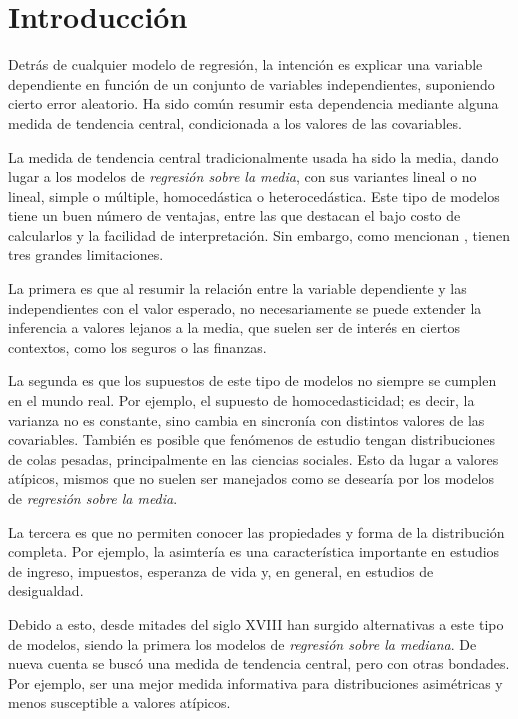 \chapter{Introducci\'on}

Detr\'as de cualquier modelo de regresi\'on, la intenci\'on es explicar una variable dependiente en funci\'on de un conjunto de variables independientes, suponiendo cierto error aleatorio. Ha sido com\'un resumir esta dependencia mediante alguna medida de tendencia central, condicionada a los valores de las covariables.

La medida de tendencia central tradicionalmente usada ha sido la media, dando lugar a los modelos de \textit{regresi\'on sobre la media}, con sus variantes lineal o no lineal, simple o m\'ultiple, homoced\'astica o heteroced\'astica. Este tipo de modelos tiene un buen n\'umero de ventajas, entre las que destacan el bajo costo de calcularlos y la facilidad de interpretaci\'on. Sin embargo, como mencionan \cite{Hao_FrecQuantReg}, tienen tres grandes limitaciones.

La primera es que al resumir la relaci\'on entre la variable dependiente y las independientes con el valor esperado, no necesariamente se puede extender la inferencia a valores lejanos a la media, que suelen ser de inter\'es en ciertos contextos, como los seguros o las finanzas.

La segunda es que los supuestos de este tipo de modelos no siempre se cumplen en el mundo real. Por ejemplo, el supuesto de homocedasticidad; es decir, la varianza no es constante, sino cambia en sincron\'ia con distintos valores de las covariables. Tambi\'en es posible que fen\'omenos de estudio tengan distribuciones de colas pesadas, principalmente en las ciencias sociales. Esto da lugar a valores at\'ipicos, mismos que no suelen ser manejados como se desear\'ia por los modelos de \textit{regresi\'on sobre la media}.

La tercera es que no permiten conocer las propiedades y forma de la distribuci\'on completa. Por ejemplo, la asimter\'ia es una caracter\'istica importante en estudios de ingreso, impuestos, esperanza de vida y, en general, en estudios de desigualdad.

Debido a esto, desde mitades del siglo XVIII han surgido alternativas a este tipo de modelos, siendo la primera los modelos de \textit{regresi\'on sobre la mediana}. De nueva cuenta se busc\'o una medida de tendencia central, pero con otras bondades. Por ejemplo, ser una mejor medida informativa para distribuciones asim\'etricas y menos susceptible a valores at\'ipicos. 


